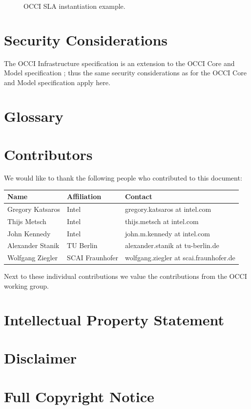 \documentclass[10pt,a4paper]{article}
\begin{document}
\begin{figure}[!h]
	{\centering {} \par}
	\caption{OCCI SLA instantiation example.}
	\label{fig:occi-slas-example}
\end{figure}




\section{Security Considerations}
The OCCI Infrastructure specification is an extension to the OCCI Core
and Model specification \cite{occi:core}; thus the same security
considerations as for the OCCI Core and Model specification apply
here.

\section{Glossary}
\label{sec:glossary}


\section{Contributors}
%

We would like to thank the following people who contributed to this document:

\begin{tabular}{l|p{2in}|p{2in}}
Name & Affiliation & Contact \\
\hline
Gregory Katsaros & Intel & gregory.katsaros at intel.com \\
Thijs Metsch & Intel & thijs.metsch at intel.com \\
John Kennedy & Intel & john.m.kennedy at intel.com \\
Alexander Stanik & TU Berlin & alexander.stanik at tu-berlin.de \\
Wolfgang Ziegler & SCAI Fraunhofer & wolfgang.ziegler at scai.fraunhofer.de \\
\end{tabular}

Next to these individual contributions we value the contributions from the OCCI working group.

\section{Intellectual Property Statement}


\section{Disclaimer}


\section{Full Copyright Notice}





\appendix
\end{document}
